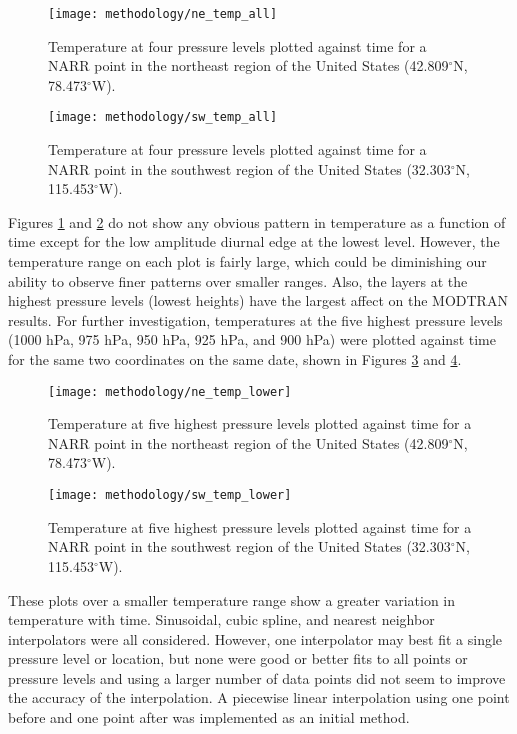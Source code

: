 \documentclass{book}
\begin{document}
\begin{figure}[H]
\centering
\texttt{[image: methodology/ne\_temp\_all]}
\caption{Temperature at four pressure levels plotted against time for a NARR point in the northeast region of the United States (42.809$^\circ$N, 78.473$^\circ$W).}
\label{fig:ne_temp_all}
\end{figure}

\begin{figure}[H]
\centering
\texttt{[image: methodology/sw\_temp\_all]}
\caption{Temperature at four pressure levels plotted against time for a NARR point in the southwest region of the United States (32.303$^\circ$N, 115.453$^\circ$W).}
\label{fig:sw_temp_all}
\end{figure}

Figures \ref{fig:ne_temp_all} and \ref{fig:sw_temp_all} do not show any obvious pattern in temperature as a function of time except for the low amplitude diurnal edge at the lowest level.  However, the temperature range on each plot is fairly large, which could be diminishing our ability to observe finer patterns over smaller ranges.  Also, the layers at the highest pressure levels (lowest heights) have the largest affect on the MODTRAN results.  For further investigation, temperatures at the five highest pressure levels (1000 hPa, 975 hPa, 950 hPa, 925 hPa, and 900 hPa) were plotted against time for the same two coordinates on the same date, shown in Figures \ref{fig:ne_temp_lower} and \ref{fig:sw_temp_lower}.

\begin{figure}[H]
\centering
\texttt{[image: methodology/ne\_temp\_lower]}
\caption{Temperature at five highest pressure levels plotted against time for a NARR point in the northeast region of the United States (42.809$^\circ$N, 78.473$^\circ$W).}
\label{fig:ne_temp_lower}
\end{figure}

\begin{figure}[H]
\centering
\texttt{[image: methodology/sw\_temp\_lower]}
\caption{Temperature at five highest pressure levels plotted against time for a NARR point in the southwest region of the United States (32.303$^\circ$N, 115.453$^\circ$W).}
\label{fig:sw_temp_lower}
\end{figure}

These plots over a smaller temperature range show a greater variation in temperature with time.  Sinusoidal, cubic spline, and nearest neighbor interpolators were all considered.  However, one interpolator may best fit a single pressure level or location, but none were good or better fits to all points or pressure levels and using a larger number of data points did not seem to improve the accuracy of the interpolation.  A piecewise linear interpolation using one point before and one point after was implemented as an initial method.
\end{document}
